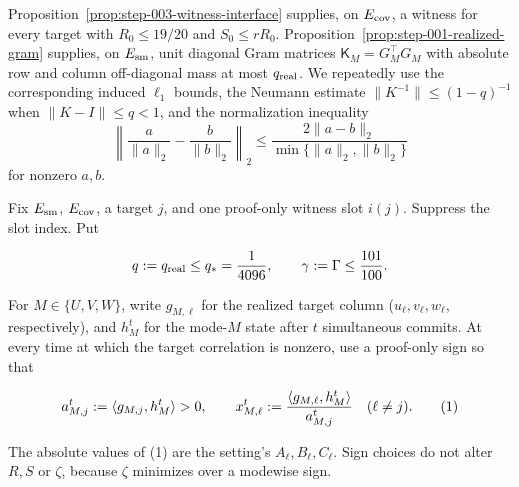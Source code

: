 Proposition~\ref{prop:step-003-witness-interface} supplies, on
\(E_{\rm cov}\), a witness for every target with \(R_0\le19/20\) and
\(S_0\le rR_0\). Proposition~\ref{prop:step-001-realized-gram} supplies, on
\(E_{\rm sm}\), unit diagonal Gram matrices
\(\mathsf K_M=G_M^\top G_M\) with absolute row and column off-diagonal mass at
most \(q_{\rm real}\). We repeatedly use the corresponding induced
$\ell_1$ bounds, the Neumann estimate
$\|K^{-1}\|\le(1-q)^{-1}$ when $\|K-I\|\le q<1$, and the normalization
inequality
\[
\left\|\frac a{\|a\|_2}-\frac b{\|b\|_2}\right\|_2
\le\frac{2\|a-b\|_2}{\min\{\|a\|_2,\|b\|_2\}}
\]
for nonzero $a,b$.

Fix \(E_{\rm sm}\), \(E_{\rm cov}\), a target \(j\), and one proof-only witness
slot \(i(j)\). Suppress the slot index. Put

\[
q:=q_{\rm real}\le q_*={1\over4096},\qquad
\gamma:=\Gamma\le {101\over100}.
\]

For \(M\in\{U,V,W\}\), write \(g_{M,\ell}\) for the realized target column
(\(u_\ell,v_\ell,w_\ell\), respectively), and \(h_M^t\) for the mode-\(M\)
state after \(t\) simultaneous commits. At every time at which the target
correlation is nonzero, use a proof-only sign so that

\[
a_{M,j}^t:=\langle g_{M,j},h_M^t\rangle>0,\qquad
x_{M,\ell}^t:={\langle g_{M,\ell},h_M^t\rangle\over a_{M,j}^t}
\quad(\ell\ne j).
\tag{1}
\]

The absolute values of (1) are the setting's \(A_\ell,B_\ell,C_\ell\).
Sign choices do not alter \(R,S\) or \(\zeta\), because \(\zeta\) minimizes
over a modewise sign.


